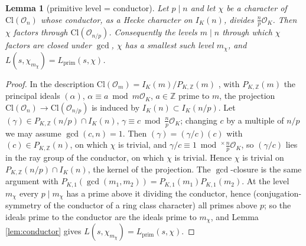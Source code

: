 \documentclass[11pt]{amsart}
\numberwithin{equation}{section}
\theoremstyle{plain}
\newtheorem{lemma}[theorem]{Lemma}
\theoremstyle{definition}
\theoremstyle{remark}
\newcommand{\Z}{\mathbb{Z}}
\newcommand{\Cl}{\mathrm{Cl}}
\newcommand{\Lprim}{L_{\mathrm{prim}}}
\newcommand{\Oc}{\mathcal{O}}
\begin{document}
\begin{lemma}[primitive level = conductor]\label{lem:primlevel}
Let $p \mid n$ and let $\chi$ be a character of $\Cl(\Oc_n)$ whose
conductor, as a Hecke character on $I_K(n)$, divides $\tfrac np\Oc_K$.
Then $\chi$ factors through $\Cl(\Oc_{n/p})$.  Consequently the levels
$m \mid n$ through which $\chi$ factors are closed under $\gcd$, $\chi$ has
a smallest such level $m_\chi$, and $L(s,\chi_{m_\chi}) = \Lprim(s,\chi)$.
\end{lemma}

\begin{proof}
In the description $\Cl(\Oc_m) = I_K(m)/P_{K,\Z}(m)$
\cite[Prop.~7.22]{Cox2013}, with $P_{K,\Z}(m)$ the principal ideals
$(\alpha)$, $\alpha \equiv a \bmod m\Oc_K$, $a \in \Z$ prime to $m$, the
projection $\Cl(\Oc_n) \to \Cl(\Oc_{n/p})$ is induced by
$I_K(n) \subset I_K(n/p)$.  Let $(\gamma) \in P_{K,\Z}(n/p)\cap I_K(n)$,
$\gamma \equiv c \bmod \tfrac np\Oc_K$; changing $c$ by a multiple of
$n/p$ we may assume $\gcd(c, n) = 1$.  Then $(\gamma) = (\gamma/c)(c)$
with $(c) \in P_{K,\Z}(n)$, on which $\chi$ is trivial, and
$\gamma/c \equiv 1 \bmod^\times\tfrac np\Oc_K$, so $(\gamma/c)$ lies in the
ray group of the conductor, on which $\chi$ is trivial.  Hence $\chi$ is
trivial on $P_{K,\Z}(n/p)\cap I_K(n)$, the kernel of the projection.  The
$\gcd$-closure is the same argument with
$P_{K,1}(\gcd(m_1,m_2)) = P_{K,1}(m_1)P_{K,1}(m_2)$.  At the level
$m_\chi$ every $p \mid m_\chi$ has a prime above it dividing the conductor,
hence (conjugation-symmetry of the conductor of a ring class character)
all primes above $p$; so the ideals prime to the conductor are the ideals
prime to $m_\chi$, and Lemma \ref{lem:conductor} gives
$L(s,\chi_{m_\chi}) = \Lprim(s,\chi)$.
\end{proof}
\end{document}
